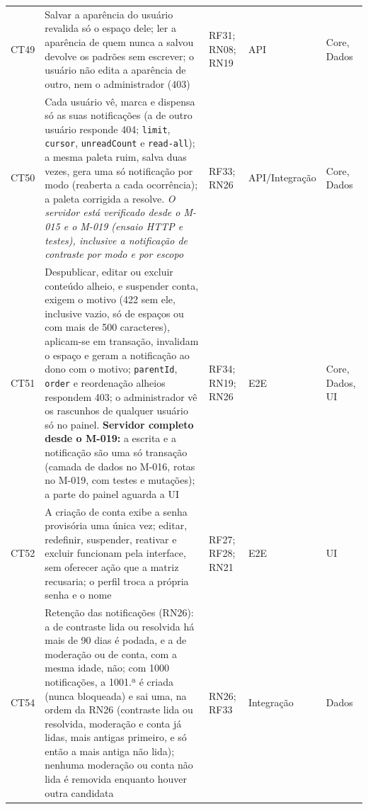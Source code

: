 \begin{longtable}{@{}L{1.1cm}L{7.0cm}L{2.2cm}L{1.6cm}L{1.6cm}@{}}
CT49 & Salvar a aparência do usuário revalida só o espaço dele; ler a aparência de quem nunca a salvou devolve os padrões sem escrever; o usuário não edita a aparência de outro, nem o administrador (403) & RF31; RN08; RN19 & API & Core, Dados\\[2pt]
CT50 & Cada usuário vê, marca e dispensa só as suas notificações (a de outro usuário responde 404; \texttt{limit}, \texttt{cursor}, \texttt{unreadCount} e \texttt{read-all}); a mesma paleta ruim, salva duas vezes, gera uma só notificação por modo (reaberta a cada ocorrência); a paleta corrigida a resolve. \emph{O servidor está verificado desde o M-015 e o M-019 (ensaio HTTP e testes), inclusive a notificação de contraste por modo e por escopo} & RF33; RN26 & API/Integração & Core, Dados\\[2pt]
CT51 & Despublicar, editar ou excluir conteúdo alheio, e suspender conta, exigem o motivo (422 sem ele, inclusive vazio, só de espaços ou com mais de 500 caracteres), aplicam-se em transação, invalidam o espaço e geram a notificação ao dono com o motivo; \texttt{parentId}, \texttt{order} e reordenação alheios respondem 403; o administrador vê os rascunhos de qualquer usuário só no painel. \textbf{Servidor completo desde o M-019:} a escrita e a notificação são uma só transação (camada de dados no M-016, rotas no M-019, com testes e mutações); a parte do painel aguarda a UI & RF34; RN19; RN26 & E2E & Core, Dados, UI\\[2pt]
CT52 & A criação de conta exibe a senha provisória uma única vez; editar, redefinir, suspender, reativar e excluir funcionam pela interface, sem oferecer ação que a matriz recusaria; o perfil troca a própria senha e o nome & RF27; RF28; RN21 & E2E & UI\\[2pt]
CT54 & Retenção das notificações (RN26): a de contraste lida ou resolvida há mais de 90 dias é podada, e a de moderação ou de conta, com a mesma idade, não; com 1000 notificações, a 1001.ª é criada (nunca bloqueada) e sai uma, na ordem da RN26 (contraste lida ou resolvida, moderação e conta já lidas, mais antigas primeiro, e só então a mais antiga não lida); nenhuma moderação ou conta não lida é removida enquanto houver outra candidata & RN26; RF33 & Integração & Dados\\[2pt]

\end{longtable}

